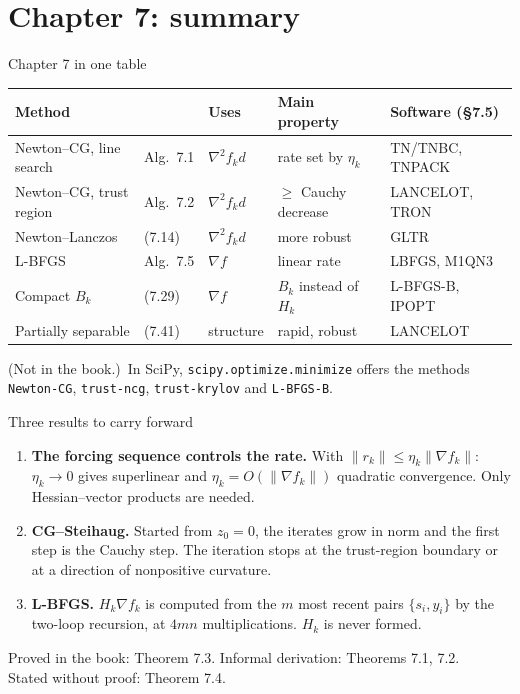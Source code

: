 \documentclass[aspectratio=169,12pt]{beamer}
\newcommand{\gradf}{\nabla f}
\newcommand{\hessf}{\nabla^{2} f}
\newcommand{\notinbook}{{\small(Not in the book.)}}
\begin{document}
\section{Chapter 7: summary}

\begin{frame}{Chapter 7 in one table}
  \begin{center}
  \small\setlength\tabcolsep{3.5pt}
  \begin{tabular}{lllll}
    \toprule
    Method & & Uses & Main property & Software (\S7.5) \\
    \midrule
    Newton--CG, line search & Alg.~7.1 & $\hessf_{k}d$ & rate set by $\eta_{k}$ & TN/TNBC, TNPACK \\
    Newton--CG, trust region & Alg.~7.2 & $\hessf_{k}d$ & $\ge$ Cauchy decrease & LANCELOT, TRON \\
    Newton--Lanczos & (7.14) & $\hessf_{k}d$ & more robust & GLTR \\
    L-BFGS & Alg.~7.5 & $\gradf$ & linear rate & LBFGS, M1QN3 \\
    Compact $B_{k}$ & (7.29) & $\gradf$ & $B_{k}$ instead of $H_{k}$ & L-BFGS-B, IPOPT \\
    Partially separable & (7.41) & structure & rapid, robust & LANCELOT \\
    \bottomrule
  \end{tabular}
  \end{center}

  \vspace{0.2em}
  \notinbook\ In SciPy, \texttt{scipy.optimize.minimize} offers the methods \texttt{Newton-CG},
  \texttt{trust-ncg}, \texttt{trust-krylov} and \texttt{L-BFGS-B}.
\end{frame}

\begin{frame}{Three results to carry forward}
  \begin{enumerate}\setlength\itemsep{0.6em}
    \item \textbf{The forcing sequence controls the rate.} With $\|r_{k}\|\le\eta_{k}\|\gradf_{k}\|$:
      $\eta_{k}\to 0$ gives superlinear and $\eta_{k}=O(\|\gradf_{k}\|)$ quadratic convergence. Only
      Hessian--vector products are needed.
    \item \textbf{CG--Steihaug.} Started from $z_{0}=0$, the iterates grow in norm and the first
      step is the Cauchy step. The iteration stops at the trust-region boundary or at a
      direction of nonpositive curvature.
    \item \textbf{L-BFGS.} $H_{k}\gradf_{k}$ is computed from the $m$ most recent pairs $\{s_{i},y_{i}\}$ by the
      two-loop recursion, at $4mn$ multiplications. $H_{k}$ is never formed.
  \end{enumerate}

  \vspace{0.6em}
  Proved in the book: Theorem 7.3. Informal derivation: Theorems 7.1, 7.2.\\
  Stated without proof: Theorem 7.4.
\end{frame}
\end{document}

